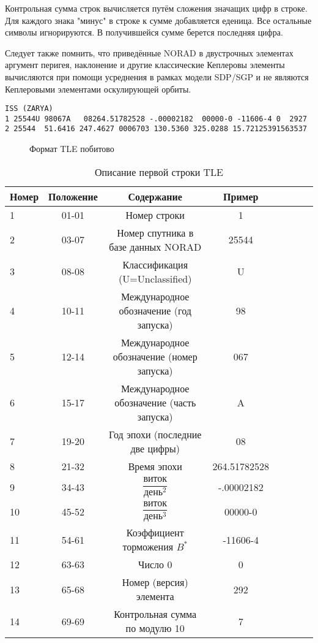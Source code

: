 Контрольная сумма строк вычисляется путём сложения значащих цифр в строке. Для каждого знака "минус" в строке к
сумме добавляется еденица. Все остальные символы игнорируются. В получившейся сумме берется последняя цифра.

Следует также помнить, что приведённые NORAD в двустрочных элементах аргумент перигея, наклонение и другие
классические Кеплеровы элементы вычисляются при помощи усреднения в рамках модели SDP/SGP и не являются Кеплеровыми
элементами оскулирующей орбиты.
\begin{lstlisting}[basicstyle=\fontsize{12}{11}\ttfamily,
	caption={TLE-Запись Для Модуля Заря Международной Космической Станции},label={lst:ISS_ZARYA}]
ISS (ZARYA)             
1 25544U 98067A   08264.51782528 -.00002182  00000-0 -11606-4 0  2927
2 25544  51.6416 247.4627 0006703 130.5360 325.0288 15.72125391563537
\end{lstlisting}
\begin{figure}[h] 
	\begin{center}
			
	\end{center}
	\caption{Формат TLE побитово} \label{fig:tle-format}
\end{figure}
\begin{table}[]
\centering
\caption{Описание первой строки TLE}
\label{tab:tle-str-1}
\begin{tabular}{l*{6}{c}r}
	Номер 	& Положение 	& Содержание								& Пример\\
	\hline
	1 		& 01-01 		& Номер строки 								& 1		\\
	2 		& 03-07			& Номер спутника в базе данных NORAD		& 25544	\\
	3		& 08-08			& Классификация (U=Unclassified)			& U		\\
	4		& 10-11			& Международное обозначение (год запуска)	& 98	\\
	5		& 12-14			& Международное обозначение (номер запуска)	& 067	\\
	6		& 15-17			& Международное обозначение (часть запуска)	& A		\\
	7		& 19-20			& Год эпохи (последние две цифры)			& 08	\\
	8		& 21-32			& Время эпохи 								& 264.51782528 \\
	9		& 34-43			& $\dfrac{\text{виток}}{\text{день}^2}$		& -.00002182 \\
	10		& 45-52			& $\dfrac{\text{виток}}{\text{день}^3}$ 	& 00000-0 \\
	11		& 54-61			& Коэффициент торможения $B^{*}$		& -11606-4 \\
	12		& 63-63			& Число 0 									& 0 \\
	13		& 65-68			& Номер (версия) элемента					& 292 \\
	14		& 69-69			& Контрольная сумма по модулю 10			& 7
\end{tabular}
\end{table}
